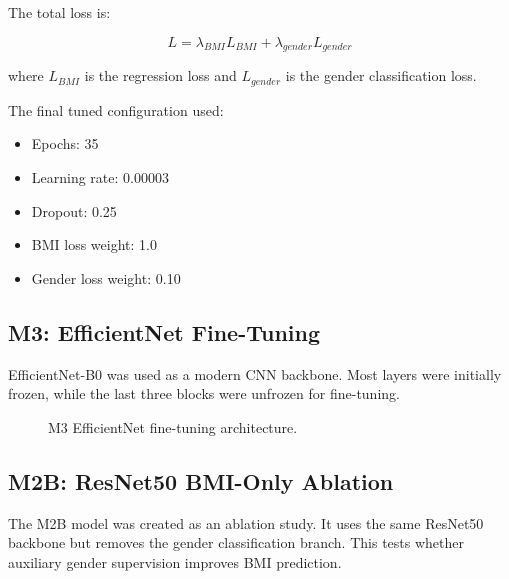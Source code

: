 \documentclass[11pt]{article}
\begin{document}
The total loss is:

\[
L = \lambda_{BMI} L_{BMI} + \lambda_{gender} L_{gender}
\]

where \(L_{BMI}\) is the regression loss and \(L_{gender}\) is the gender classification loss.

The final tuned configuration used:

\begin{itemize}
    \item Epochs: 35
    \item Learning rate: 0.00003
    \item Dropout: 0.25
    \item BMI loss weight: 1.0
    \item Gender loss weight: 0.10
\end{itemize}

\subsection{M3: EfficientNet Fine-Tuning}

EfficientNet-B0 was used as a modern CNN backbone. Most layers were initially frozen, while the last three blocks were unfrozen for fine-tuning.

\begin{figure}[H]
\centering
{}
\caption{M3 EfficientNet fine-tuning architecture.}
\end{figure}

\subsection{M2B: ResNet50 BMI-Only Ablation}

The M2B model was created as an ablation study. It uses the same ResNet50 backbone but removes the gender classification branch. This tests whether auxiliary gender supervision improves BMI prediction.
\end{document}
